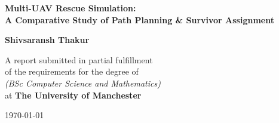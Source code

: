 \documentclass[12pt,a4paper]{report}
\begin{document}
\begin{titlepage}
    \begin{center}
        \vspace*{1cm}

        {\LARGE \textbf{Multi-UAV Rescue Simulation:}\\
        \vspace{0.3em}
        \textbf{A Comparative Study of Path Planning \& Survivor Assignment}}

        \vspace{2cm}
        \textbf{Shivsaransh Thakur}

        \vfill

        A report submitted in partial fulfillment \\
        of the requirements for the degree of \\
        \emph{(BSc Computer Science and Mathematics)} \\
        at \textbf{The University of Manchester}

        \vspace{1.5cm}
        \today

        \vfill
    \end{center}
\end{titlepage}
\end{document}
